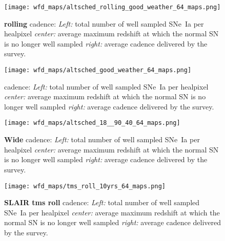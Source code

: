 

\begin{figure}[!htbp]
  \begin{center}
    \texttt{[image: wfd\_maps/altsched\_rolling\_good\_weather\_64\_maps.png]}
    \caption{ {\bf \altsched rolling} cadence: {\em Left:} total number
      of well sampled SNe~Ia per healpixel {\em center:} average
      maximum redshift at which the normal SN is no longer well
      sampled {\em right:} average cadence delivered by the survey.}
    \label{fig:altsched_rolling_good_weather}
  \end{center}
\end{figure}


  
\begin{figure}[!htbp]
  \begin{center}
    \texttt{[image: wfd\_maps/altsched\_good\_weather\_64\_maps.png]}
    \caption{ {\bf \altsched} cadence: {\em Left:} total number of well
      sampled SNe~Ia per healpixel {\em center:} average maximum
      redshift at which the normal SN is no longer well sampled {\em
        right:} average cadence delivered by the survey.}
    \label{fig:altsched_good_weather}
  \end{center}
\end{figure}

  
\begin{figure}[!htbp]
  \begin{center}
    \texttt{[image: wfd\_maps/altsched\_18\_\_90\_40\_64\_maps.png]}
    \caption{{\bf \altsched Wide} cadence: {\em Left:} total number of well
      sampled SNe~Ia per healpixel {\em center:} average maximum
      redshift at which the normal SN is no longer well sampled {\em
        right:} average cadence delivered by the survey.}
  \end{center}
  \label{fig:altsched_wide}
\end{figure}



  \begin{figure}[!htbp]
  \begin{center}
    \texttt{[image: wfd\_maps/tms\_roll\_10yrs\_64\_maps.png]}
    \caption{{\bf SLAIR tms roll} cadence: {\em Left:} total number of well
      sampled SNe~Ia per healpixel {\em center:} average maximum
      redshift at which the normal SN is no longer well sampled {\em
        right:} average cadence delivered by the survey.}
    \label{fig:tms_roll}
  \end{center}
\end{figure}

